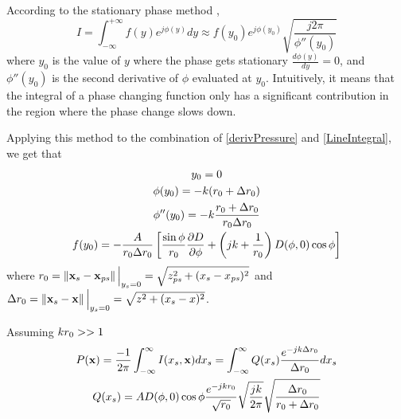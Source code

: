 According to the stationary phase method \cite{Verheijen},
\begin{equation}
I = \int_{-\infty}^{+\infty} f(y) e^{j\phi(y)} dy \approx f(y_0) e^{j\phi(y_0)} \sqrt{\frac{j 2\pi}{\phi''(y_0)}}
\end{equation}
where $y_0$ is the value of $y$ where the phase gets stationary $\frac{d\phi(y)}{dy} = 0$, and $\phi''(y_0)$ is the second derivative of $\phi$ evaluated at $y_0$. Intuitively, it means that the integral of a phase changing function only has a significant contribution in the region where the phase change slows down.

Applying this method to the combination of \autoref{derivPressure} and \autoref{LineIntegral}, we get that
\begin{gather}
	y_0 = 0 \\
	\phi(y_0) = -k(\distLinePrimSource + \distLinePoint) \\
	\phi''(y_0) = -k\frac{\distLinePrimSource + \distLinePoint}{\distLinePrimSource \distLinePoint} \\
	f(y_0) = -\frac{A}{\distLinePrimSource \distLinePoint}\left[ \frac{\sin\phi}{\distLinePrimSource} \frac{\partial\Diag}{\partial\phi} + \left(jk + \frac{1}{\distLinePrimSource}\right) \Diag(\phi, 0) \cos\phi \right]
\end{gather}
where $\distLinePrimSource = \norm{\PosTheo[surface] - \PosTheo[primarySource]}\Big\vert_{y_{\PosTheoSubInd[surface]} = 0} = \sqrt{z_{\PosTheoSubInd[primarySource]}^2 + (x_{\PosTheoSubInd[surface]} - x_{\PosTheoSubInd[primarySource]})^2}$ and $\distLinePoint = \norm{\PosTheo[surface] - \PosTheo}\Big\vert_{y_{\PosTheoSubInd[surface]} = 0} = \sqrt{z^2 + (x_{\PosTheoSubInd[surface]} - x)^2}$.

Assuming $kr_0 >> 1$
\begin{gather}
P(\PosTheo) = \frac{-1}{2\pi} \int_{-\infty}^{\infty} I(x_{\PosTheoSubInd[surface]}, \PosTheo) dx_{\PosTheoSubInd[surface]} = \int_{-\infty}^{\infty} Q(x_{\PosTheoSubInd[surface]})
\frac{e^{-jk\distLinePoint}}{\distLinePoint} dx_{\PosTheoSubInd[surface]} \label{RayleighI2.5}\\ 
Q(x_{\PosTheoSubInd[surface]}) = A \Diag(\phi, 0) \cos\phi \frac{e^{-jk \distLinePrimSource}}{\sqrt{\distLinePrimSource}} \sqrt{\frac{jk}{2\pi}} \sqrt{\frac{\distLinePoint}{\distLinePrimSource + \distLinePoint}}
\end{gather}

